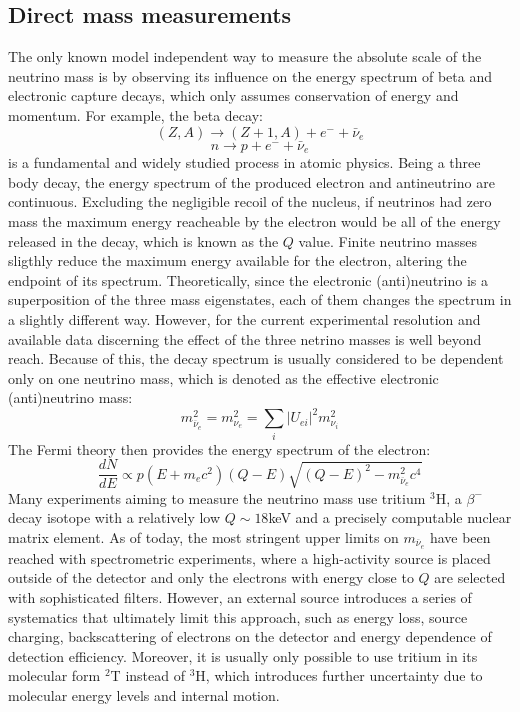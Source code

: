 \subsection{Direct mass measurements}
The only known model independent way to measure the absolute scale of the neutrino mass is by observing its influence on
the energy spectrum of beta and electronic capture decays, which only assumes conservation of energy and momentum.
For example, the beta decay:
\begin{equation}
 (Z, A) \rightarrow (Z + 1, A) + e^- + \bar{\nu}_e
\end{equation}
\[
 n \rightarrow p + e^- + \bar{\nu}_e
\]
is a fundamental and widely studied process in atomic physics. Being a three body decay, the energy spectrum of the
produced electron and antineutrino are continuous. Excluding the negligible recoil of the nucleus, if neutrinos had zero mass the maximum energy reacheable by the
electron would be all of the energy released in the decay, which is known as the $Q$ value. 
Finite neutrino masses sligthly reduce the maximum energy available for the electron, altering the endpoint of its
spectrum. Theoretically, since the electronic (anti)neutrino is a superposition of the three mass eigenstates, each of
them changes the spectrum in a slightly different way. However, for the current
experimental resolution and available data discerning the effect of the three netrino masses is well beyond reach.
Because of this, the decay spectrum is usually considered to be dependent only on one neutrino mass, which is denoted as
the effective electronic
(anti)neutrino mass: 
\begin{equation}
 m_{\overline{\nu}_{e}}^{2} = m_{\nu_{e}}^{2}=\sum_{i}|U_{e i}|^{2}m_{\nu_{i}}^{2}
\end{equation}
The Fermi theory then provides the energy spectrum of the electron:
\begin{equation}
  \frac{d N}{d E} \propto p(E+m_{e}c^{2})(Q-E)\sqrt{(Q-E)^{2}-m_{\overline{\nu}_{e}}^{2}c^{4}}
\end{equation}
Many experiments aiming to measure the neutrino mass use tritium $^3$H, a $\beta^-$ decay isotope with a relatively low $Q\sim
18$keV and a precisely computable nuclear matrix element. As of today, the most stringent upper limits on
$m_{\overline{\nu}_{e}}$ have been reached with spectrometric experiments, where a
high-activity source is placed outside of the detector and only the electrons with energy close to $Q$ are selected with
sophisticated filters.
However, an external source introduces a series of systematics that ultimately limit this approach, such as energy
loss, source charging, backscattering of electrons on the detector and energy dependence of detection efficiency.
Moreover, it is usually only possible to use tritium in its molecular form $^2$T instead of $^3$H, which introduces
further uncertainty due to molecular energy levels and internal motion.
